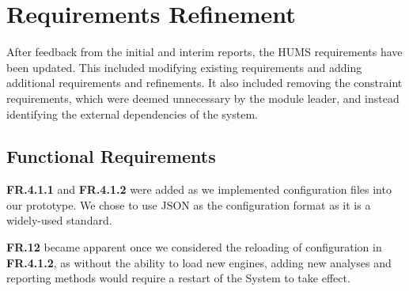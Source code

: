 \documentclass[10pt,a4paper]{article}
\newcommand{\fr}[1]{\textcolor{reqColor}{\textbf{FR.#1}}}
\begin{document}
\section{Requirements Refinement}
\label{sec:requirements}
After feedback from the initial and interim reports, the HUMS requirements have been updated. This included modifying existing requirements and adding additional requirements and refinements. It also included removing the constraint requirements, which were deemed unnecessary by the module leader, and instead identifying the external dependencies of the system.

\subsection{Functional Requirements}
\label{sec:functional_requirements}

\fr{4.1.1} and \fr{4.1.2} were added as we implemented configuration files into our prototype. We chose to use JSON as the configuration format as it is a widely-used standard.

\fr{12} became apparent once we considered the reloading of configuration in \fr{4.1.2}, as without the ability to load new engines, adding new analyses and reporting methods would require a restart of the System to take effect.
\end{document}
